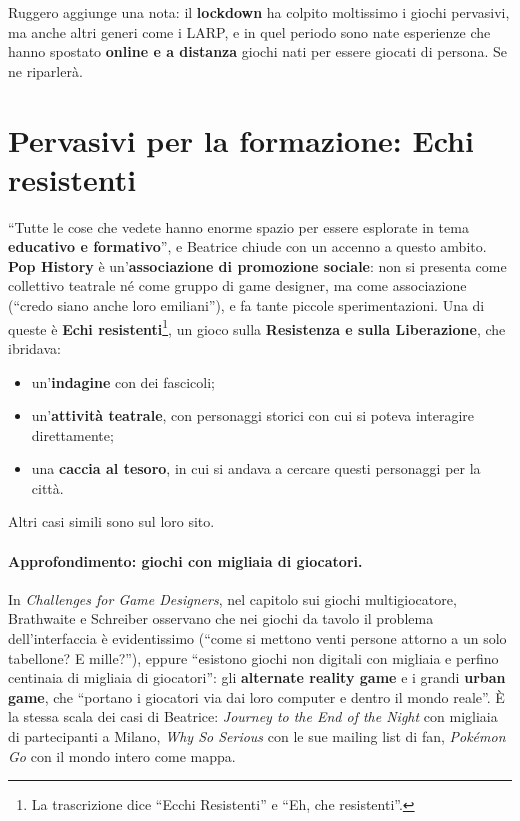 Ruggero aggiunge una nota: il \textbf{lockdown} ha colpito moltissimo i giochi
pervasivi, ma anche altri generi come i LARP, e in quel periodo sono nate
esperienze che hanno spostato \textbf{online e a distanza} giochi nati per essere
giocati di persona. Se ne riparlerà.

\section{Pervasivi per la formazione: Echi resistenti}
\label{a2:sec:pervasivi-edu}



``Tutte le cose che vedete hanno enorme spazio per essere esplorate in tema
\textbf{educativo e formativo}'', e Beatrice chiude con un accenno a questo
ambito. \textbf{Pop History} è un'\textbf{associazione di promozione sociale}:
non si presenta come collettivo teatrale né come gruppo di game designer, ma come
associazione (``credo siano anche loro emiliani''), e fa tante piccole
sperimentazioni. Una di queste è \textbf{Echi resistenti}\footnote{La
trascrizione dice ``Ecchi Resistenti'' e ``Eh, che resistenti''.}, un gioco
sulla \textbf{Resistenza e sulla Liberazione}, che ibridava:
\begin{itemize}
  \item un'\textbf{indagine} con dei fascicoli;
  \item un'\textbf{attività teatrale}, con personaggi storici con cui si poteva
        interagire direttamente;
  \item una \textbf{caccia al tesoro}, in cui si andava a cercare questi
        personaggi per la città.
\end{itemize}
Altri casi simili sono sul loro sito.

\paragraph{Approfondimento: giochi con migliaia di giocatori.} In
\emph{Challenges for Game Designers}, nel capitolo sui giochi multigiocatore,
Brathwaite e Schreiber osservano che nei giochi da tavolo il problema
dell'interfaccia è evidentissimo (``come si mettono venti persone attorno a un
solo tabellone? E mille?''), eppure ``esistono giochi non digitali con migliaia
e perfino centinaia di migliaia di giocatori'': gli \textbf{alternate reality
game} e i grandi \textbf{urban game}, che ``portano i giocatori via dai loro
computer e dentro il mondo reale''. È la stessa scala dei casi di Beatrice:
\emph{Journey to the End of the Night} con migliaia di partecipanti a Milano,
\emph{Why So Serious} con le sue mailing list di fan, \emph{Pokémon Go} con il
mondo intero come mappa.

